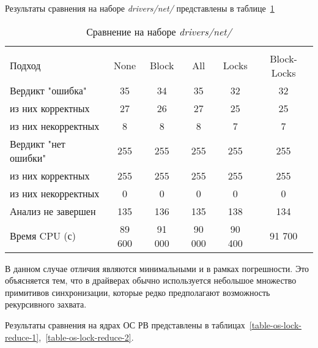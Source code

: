 Результаты сравнения на наборе \textit{drivers/net/} представлены в таблице~\ref{table-drivers-lock-reduce}

  \begin{table}[h]\footnotesize \centering
    \caption{Сравнение на наборе \textit{drivers/net/}}
  	\label{table-drivers-lock-reduce}
    \begin{tabular}{ | l | c | c | c | c | c |}
      \hline
      		& 		\multicolumn{5}{c|}{\combatmode}  \\
      Подход         				& None 	& Block 	& All 		& Locks 	& Block-Locks \\ \hline
      Вердикт "ошибка" 				& 35   	& 34       	& 35    	& 32       	& 32     \\ 
  \hspace{0.5cm} из них корректных 	& 27 	& 26 		& 27    	& 25       	& 25   \\ 
  \hspace{0.5cm} из них некорректных & 8 	& 8 		& 8     	& 7       	& 7    \\ \hline
      Вердикт "нет ошибки"  		& 255   & 255       & 255   	& 255       & 255     \\ 
  \hspace{0.5cm} из них корректных 	& 255 	& 255    	& 255   	& 255       & 255     \\
  \hspace{0.5cm} из них некорректных & 0 	& 0    		& 0     	& 0       	& 0  \\ \hline
      Анализ не завершен       		& 135    & 136      & 135    	& 138       & 134  \\ \hline
      Время CPU (с)   				& 89 600 & 91 000   & 90 000    & 90 400    & 91 700  \\ 
      \hline
    \end{tabular}
  \end{table}

В данном случае отличия являются минимальными и в рамках погрешности. 
Это объясняется тем, что в драйверах обычно используется небольшое множество примитивов синхронизации, которые редко предполагают возможность рекурсивного захвата.

Результаты сравнения на ядрах ОС РВ представлены в таблицах~\ref{table-os-lock-reduce-1},~\ref{table-os-lock-reduce-2}.

